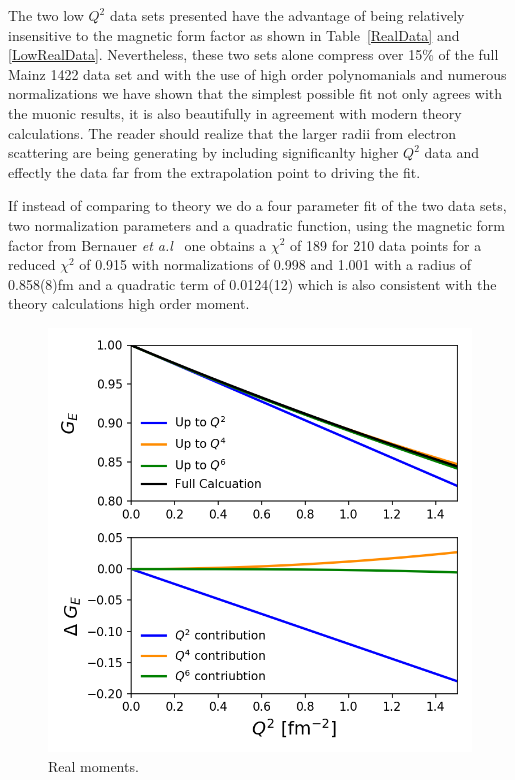 \documentclass[10pt,aps,prc,twocolumn]{revtex4-1}
\begin{document}
The two low $Q^2$ data sets presented have the advantage of being relatively insensitive to the magnetic form 
factor as shown in Table~\ref{RealData} and \ref{LowRealData}.   Nevertheless, these two sets alone compress
over 15\% of the full Mainz 1422 data set and with the use of high order polynomanials and numerous normalizations
we have shown that the simplest possible fit not only agrees with the muonic results, it is also beautifully in
agreement with modern theory calculations.   The reader should realize that the larger radii from electron scattering
are being generating by including significanlty higher $Q^2$ data and effectly the data far from the extrapolation
point to driving the fit.

If instead of comparing to theory we do a four parameter fit of the two data sets,
two normalization parameters and a quadratic function, 
using the magnetic form factor from Bernauer {\it{et a.l}}~\cite{Bernauer:2010wm}
one obtains a $\chi^2$ of 189 for 210 data points for a reduced $\chi^2$ of 0.915 with 
normalizations of 0.998 and 1.001 with a radius of 0.858(8)fm and a quadratic term of
0.0124(12) which is also consistent with the theory calculations high order moment.

\begin{figure}
\includegraphics[width=\columnwidth]{Figure/RealMoments.png}
\caption{Real moments.}
\end{figure}
\end{document}

